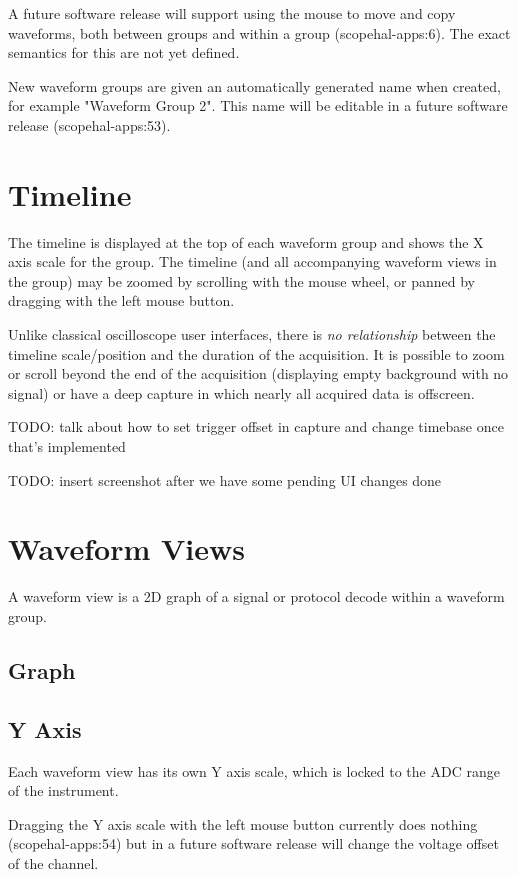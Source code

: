 \documentclass[11pt]{article}
\begin{document}
A future software release will support using the mouse to move and copy waveforms, both between groups and within a
group (scopehal-apps:6). The exact semantics for this are not yet defined.

New waveform groups are given an automatically generated name when created, for example "Waveform Group 2". This name
will be editable in a future software release (scopehal-apps:53).

\section{Timeline}

The timeline is displayed at the top of each waveform group and shows the X axis scale for the group. The timeline (and
all accompanying waveform views in the group) may be zoomed by scrolling with the mouse wheel, or panned by dragging
with the left mouse button.

Unlike classical oscilloscope user interfaces, there is \emph{no relationship} between the timeline scale/position and
the duration of the acquisition. It is possible to zoom or scroll beyond the end of the acquisition (displaying empty
background with no signal) or have a deep capture in which nearly all acquired data is offscreen.

TODO: talk about how to set trigger offset in capture and change timebase once that's implemented

TODO: insert screenshot after we have some pending UI changes done

\section{Waveform Views}

A waveform view is a 2D graph of a signal or protocol decode within a waveform group.

\subsection{Graph}

\subsection{Y Axis}

Each waveform view has its own Y axis scale, which is locked to the ADC range of the instrument.

Dragging the Y axis scale with the left mouse button currently does nothing (scopehal-apps:54) but in a future software
release will change the voltage offset of the channel.
\end{document}

